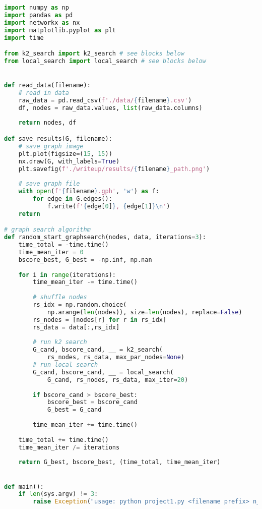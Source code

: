 \documentclass[twoside,11pt]{article}
\begin{document}
\begin{algorithm}
\begin{small}
\begin{lstlisting}[language=Python]
import numpy as np
import pandas as pd
import networkx as nx
import matplotlib.pyplot as plt
import time

from k2_search import k2_search # see blocks below
from local_search import local_search # see blocks below


def read_data(filename):
    # read in data    
    raw_data = pd.read_csv(f'./data/{filename}.csv')
    df, nodes = raw_data.values, list(raw_data.columns)
    
    return nodes, df

def save_results(G, filename):
    # save graph image
    plt.plot(figsize=(15, 15))
    nx.draw(G, with_labels=True)
    plt.savefig(f'./writeup/results/{filename}_path.png')
    
    # save graph file
    with open(f'{filename}.gph', 'w') as f:
        for edge in G.edges():
            f.write(f'{edge[0]}, {edge[1]}\n')
    return

# graph search algorithm
def random_start_graphsearch(nodes, data, iterations=3):
    time_total = -time.time()
    time_mean_iter = 0
    bscore_best, G_best = -np.inf, np.nan
    
    for i in range(iterations):
        time_mean_iter -= time.time()
        
        # shuffle nodes
        rs_idx = np.random.choice(
            np.arange(len(nodes)), size=len(nodes), replace=False)
        rs_nodes = [nodes[r] for r in rs_idx]
        rs_data = data[:,rs_idx]
        
        # run k2 search
        G_cand, bscore_cand, __ = k2_search(
            rs_nodes, rs_data, max_par_nodes=None)
        # run local search
        G_cand, bscore_cand, __ = local_search(
            G_cand, rs_nodes, rs_data, max_iter=20)
        
        if bscore_cand > bscore_best:
            bscore_best = bscore_cand
            G_best = G_cand
        
        time_mean_iter += time.time()
        
    time_total += time.time()
    time_mean_iter /= iterations
    
    return G_best, bscore_best, (time_total, time_mean_iter)


def main():
    if len(sys.argv) != 3:
        raise Exception("usage: python project1.py <filename prefix> n_iterations")


\end{lstlisting}
\end{small}
\end{algorithm}
\end{document}

